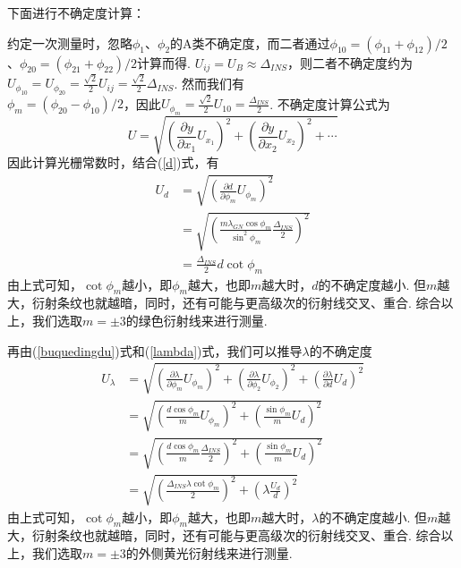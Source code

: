 \documentclass[UTF8]{ctexart}
\begin{document}
\hspace{-2em}下面进行不确定度计算：\par
约定一次测量时，忽略$\phi_1$、$\phi_2$的A类不确定度，而二者通过$\phi_{10}=(\phi_{11}+\phi_{12})/2$、$\phi_{20}=(\phi_{21}+\phi_{22})/2$计算而得. $U_{ij}=U_B\approx\Delta_{INS}$，则二者不确定度约为$\displaystyle{U_{\phi_{10}}=U_{\phi_{20}}=\frac{\sqrt2}{2}U_{ij}=\frac{\sqrt2}{2}\Delta_{INS}}$. 然而我们有\\$\phi_m=(\phi_{20}-\phi_{10})/2$，因此$\displaystyle{U_{\phi_m}=\frac{\sqrt2}{2}U_{10}=\frac{\Delta_{INS}}{2}}$. 不确定度计算公式为
\begin{equation}
    \label{buquedingdu}
    U=\sqrt{(\frac{\partial y}{\partial x_1}U_{x_1})^2+(\frac{\partial y}{\partial x_2}U_{x_2})^2+\cdots}
\end{equation}
因此计算光栅常数时，结合(\ref{d})式，有
\begin{equation}\begin{split}
    U_d&=
    \sqrt{(\frac{\partial d}{\partial \phi_{m}}U_{\phi_{m}})^2}\\
    &=\sqrt{
        (\frac{m\lambda_{GN}\cos\phi_m}
        {\sin^2\phi_m}\frac{\Delta_{INS}}{2})^2}\\
    &=\frac{\Delta_{INS}}{2}d \cot\phi_m
\end{split}\end{equation}
由上式可知，$\displaystyle{\cot\phi_m}$越小，即$\phi_m$越大，也即$m$越大时，$d$的不确定度越小. 但$m$越大，衍射条纹也就越暗，同时，还有可能与更高级次的衍射线交叉、重合. 综合以上，我们选取$m=\pm3$的绿色衍射线来进行测量.\par
再由(\ref{buquedingdu})式和(\ref{lambda})式，我们可以推导$\lambda$的不确定度
\begin{equation}\begin{split}
    U_{\lambda}&=
    \sqrt{(\frac{\partial \lambda}{\partial \phi_{m}}U_{\phi_{m}})^2+(\frac{\partial \lambda}{\partial \phi_{2}}U_{\phi_{2}})^2+(\frac{\partial \lambda}{\partial d}U_d)^2}\\
    &=\sqrt{(\frac{d\cos\phi_m}{m}U_{\phi_{m}})^2+(\frac{\sin\phi_m}{m}U_d)^2}\\
    &=\sqrt{(\frac{d\cos\phi_m}{m}\frac{\Delta_{INS}}{2})^2+(\frac{\sin\phi_m}{m}U_d)^2}\\
    &=\sqrt{(\frac{\Delta_{INS}\lambda \cot\phi_m}{2})^2+(\lambda\frac{U_d}{d})^2}
\end{split}\end{equation}
由上式可知，$\displaystyle{\cot\phi_m}$越小，即$\phi_m$越大，也即$m$越大时，$\lambda$的不确定度越小. 但$m$越大，衍射条纹也就越暗，同时，还有可能与更高级次的衍射线交叉、重合. 综合以上，我们选取$m=\pm3$的外侧黄光衍射线来进行测量.\par
\end{document}
